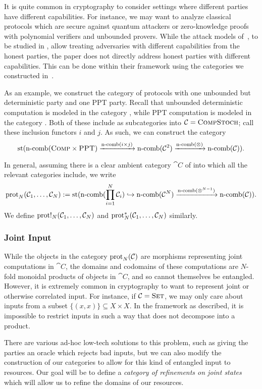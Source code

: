 It is quite common in cryptography to consider settings where different parties
have different capabilities. For instance, we may want to analyze classical
protocols which are secure against quantum attackers or zero-knowledge proofs
with polynomial verifiers and unbounded provers. While the attack models
of~\cite{broadbent-karvonen-2022}, to be studied in
, allow treating
adversaries with different capabilities from the honest parties, the paper does
not directly address honest parties with different capabilities. This can be
done within their framework using the categories we constructed
in~.

As an example, we construct the category of protocols with one unbounded but
deterministic party and one PPT party. Recall that unbounded deterministic
computation is modeled in the category , while PPT computation is
modeled in the category . Both of these include as subcategories into
${\mathcal{C}} = {\textsc{\text{CompStoch}}}$; call these inclusion functors $i$ and $j$. As such, we can
construct the category \[
  \operatorname*{st}(\operatorname*{n-comb}({\textsc{\text{Comp}}}\times{\textsc{\text{PPT}}})\xrightarrow{\operatorname*{n-comb}(i\times
    j)}\operatorname*{n-comb}({\mathcal{C}}^2)\xrightarrow{\operatorname*{n-comb}(\otimes)}\operatorname*{n-comb}({\mathcal{C}})).
\]

In general, assuming there is a clear ambient category $\cat{C}$ of
into which all the relevant categories include, we write \[
  \operatorname{prot}_{N}({\mathcal{C}}_1,\dots,{\mathcal{C}}_N) := \operatorname*{st}(\operatorname*{n-comb}(\prod_{i=1}^N
  {\mathcal{C}}_i)\hookrightarrow\operatorname*{n-comb}({\mathcal{C}}^N)\xrightarrow{\operatorname*{n-comb}(\otimes^{N-1})}\operatorname*{n-comb}({\mathcal{C}})).
\]
We define $\operatorname{prot}!_{N}({\mathcal{C}}_1,\dots,{\mathcal{C}}_N)$ and
$\operatorname{prot}^*_{N}({\mathcal{C}}_1,\dots,{\mathcal{C}}_N)$ similarly.

\subsubsection{Joint Input}

While the objects in the category $\operatorname{prot}_{N}({\mathcal{C}})$ are morphisms representing
joint computations in $\cat{C}$, the domains and codomains of these computations
are $N$-fold monoidal products of objects in $\cat{C}$, and so cannot themselves be
entangled. However, it is extremely common in cryptography to want to represent
joint or otherwise correlated input. For instance, if ${\mathcal{C}} =
{\textsc{\text{Set}}}$, we may only care about inputs from a subset $\{(x, x)\}\subseteq
X\times X$. In the framework as described, it is impossible to restrict inputs
in such a way that does not decompose into a product.

There are various ad-hoc low-tech solutions to this problem, such as giving
the parties an oracle which rejects bad inputs, but we can also modify the
construction of our categories to allow for this kind of entangled input to
resources. Our goal will be to define a \emph{category of refinements on joint
states} which will allow us to refine the domains of our resources.

